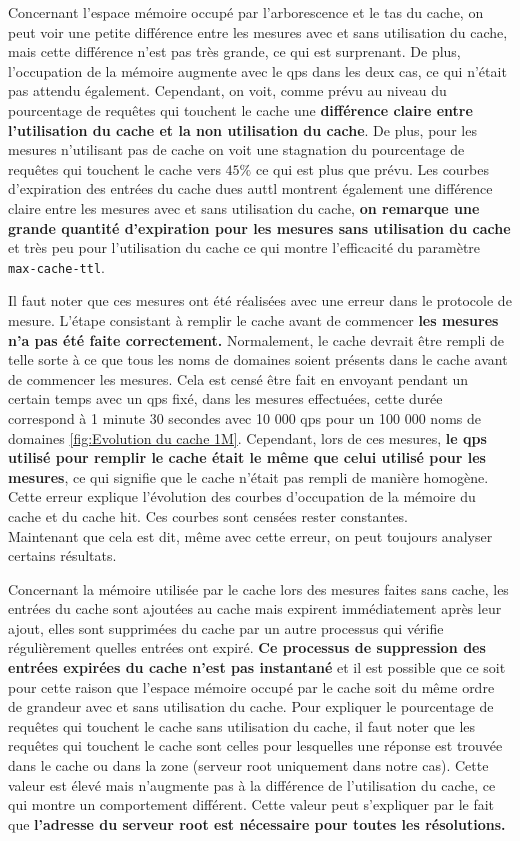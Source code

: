 \documentclass[12pt, a4paper]{report}
\begin{document}
	Concernant l'espace mémoire occupé par l'arborescence et le tas du cache, on peut voir une petite différence entre les mesures avec et sans utilisation du cache, mais cette différence n'est pas très grande, ce qui est surprenant. De plus, l'occupation de la mémoire augmente avec le \gls{qps} dans les deux cas, ce qui n'était pas attendu également. Cependant, on voit, comme prévu au niveau du pourcentage de requêtes qui touchent le cache une \textbf{différence claire entre l'utilisation du cache et la non utilisation du cache}. De plus, pour les mesures n'utilisant pas de cache on voit une stagnation du pourcentage de requêtes qui touchent le cache vers $45\%$ ce qui est plus que prévu. Les courbes d'expiration des entrées du cache dues au\gls{ttl} montrent également une différence claire entre les mesures avec et sans utilisation du cache, \textbf{on remarque une grande quantité d'expiration pour les mesures sans utilisation du cache} et très peu pour l'utilisation du cache ce qui montre l'efficacité du paramètre \texttt{max-cache-ttl}.

	Il faut noter que ces mesures ont été réalisées avec une erreur dans le protocole de mesure. L'étape consistant à remplir le cache avant de commencer \textbf{les mesures n'a pas été faite correctement.} Normalement, le cache devrait être rempli de telle sorte à ce que tous les noms de domaines soient présents dans le cache avant de commencer les mesures. Cela est censé être fait en envoyant pendant un certain temps avec un \gls{qps} fixé, dans les mesures effectuées, cette durée correspond à 1 minute 30 secondes avec 10 000 \gls{qps} pour un 100 000 noms de domaines \ref{fig:Evolution du cache 1M}. Cependant, lors de ces mesures, \textbf{le \gls{qps} utilisé pour remplir le cache était le même que celui utilisé pour les mesures}, ce qui signifie que le cache n'était pas rempli de manière homogène. 
	Cette erreur explique l'évolution des courbes d'occupation de la mémoire du cache et du cache hit. Ces courbes sont censées rester constantes.\\

	Maintenant que cela est dit, même avec cette erreur, on peut toujours analyser certains résultats.

	Concernant la mémoire utilisée par le cache lors des mesures faites sans cache, les entrées du cache sont ajoutées au cache mais expirent immédiatement après leur ajout, elles sont supprimées du cache par un autre processus qui vérifie régulièrement quelles entrées ont expiré. \textbf{Ce processus de suppression des entrées expirées du cache n'est pas instantané} et il est possible que ce soit pour cette raison que l'espace mémoire occupé par le cache soit du même ordre de grandeur avec et sans utilisation du cache. Pour expliquer le pourcentage de requêtes qui touchent le cache sans utilisation du cache, il faut noter que les requêtes qui touchent le cache sont celles pour lesquelles une réponse est trouvée dans le cache ou dans la zone (serveur root uniquement dans notre cas). Cette valeur est élevé mais n'augmente pas à la différence de l'utilisation du cache, ce qui montre un comportement différent. Cette valeur peut s'expliquer par le fait que \textbf{l'adresse du serveur root est nécessaire pour toutes les résolutions.}
	
\end{document}
